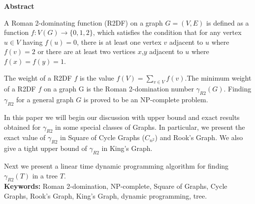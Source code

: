 \bigskip  \bigskip \bigskip \bigskip \bigskip \bigskip
\hfill  \hfill \hfill
\Large
\begin{center}
\textbf{Abstract}
\end{center}
\newcommand{\rdom}{\gamma_{R2}}
\bigskip  
\small
A Roman {2}-dominating function (R2DF) on a graph $G = (V,E)$ is defined as a function $f: V(G) \rightarrow \{0,1,2\}$, which satisfies the condition that for any vertex $u \in V$ having $f(u) = 0$, there is at least one vertex $v$ adjacent to $u$ where $f(v) = 2$ or there are at least two vertices $x$,$y$ adjacent to $u$ where $f(x) = f(y) = 1$.

The weight of a R2DF $f$ is the value $f(V) = \sum_{v \in V} f(v)$.The minimum weight of a R2DF $f$ on a graph G is the Roman {2}-domination number $\rdom(G)$. Finding $\rdom$ for a general graph $G$ is proved to be an NP-complete problem.

In this paper we will begin our discussion with upper bound and exact results obtained for $\rdom$ in some special classes of Graphs. In particular, we present the exact value of $\rdom$ in Square of Cycle Graphs ($C_{n^{2}}$) and Rook's Graph. We also give a tight upper bound of $\rdom$ in King's Graph.

Next we present a linear time dynamic programming algorithm for finding $\rdom(T)$ in a tree $T$.
\\

\textbf{Keywords:} Roman {2}-domination, NP-complete, Square of Graphs, Cycle Graphs, Rook's Graph, King's Graph, dynamic programming, tree.


